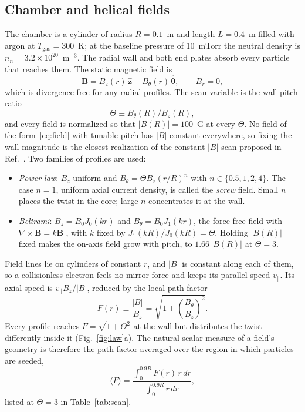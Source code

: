 \documentclass[11pt]{article}
\begin{document}
\subsection{Chamber and helical fields}
\label{sec:fields}

The chamber is a cylinder of radius $R = 0.1$~m and length $L = 0.4$~m filled with argon at $T_{\mathrm{gas}} = 300$~K; at the baseline pressure of 10~mTorr the neutral density is $n_n = 3.2\times10^{20}$~m$^{-3}$. The radial wall and both end plates absorb every particle that reaches them. The static magnetic field is
\begin{equation}
\mathbf{B} = B_z(r)\,\hat{\mathbf{z}} + B_\theta(r)\,\hat{\boldsymbol{\theta}}, \qquad B_r = 0,
\label{eq:field}
\end{equation}
which is divergence-free for any radial profiles. The scan variable is the wall pitch ratio
\begin{equation}
\Theta \equiv B_\theta(R)/B_z(R),
\end{equation}
and every field is normalized so that $|B(R)| = 100$~G at every $\Theta$. No field of the form~\eqref{eq:field} with tunable pitch has $|B|$ constant everywhere, so fixing the wall magnitude is the closest realization of the constant-$|B|$ scan proposed in Ref.~\cite{auerbach2026}. Two families of profiles are used:
\begin{itemize}
  \item \emph{Power law}: $B_z$ uniform and $B_\theta = \Theta B_z (r/R)^n$ with $n \in \{0.5, 1, 2, 4\}$. The case $n = 1$, uniform axial current density, is called the \emph{screw} field. Small $n$ places the twist in the core; large $n$ concentrates it at the wall.
  \item \emph{Beltrami}: $B_z = B_0 J_0(kr)$ and $B_\theta = B_0 J_1(kr)$, the force-free field with $\nabla\times\mathbf{B} = k\mathbf{B}$ \cite{taylor1974,freidberg}, with $k$ fixed by $J_1(kR)/J_0(kR) = \Theta$. Holding $|B(R)|$ fixed makes the on-axis field grow with pitch, to $1.66\,|B(R)|$ at $\Theta = 3$.
\end{itemize}

Field lines lie on cylinders of constant $r$, and $|B|$ is constant along each of them, so a collisionless electron feels no mirror force and keeps its parallel speed $v_\parallel$. Its axial speed is $v_\parallel B_z/|B|$, reduced by the local path factor
\begin{equation}
F(r) \equiv \frac{|B|}{B_z} = \sqrt{1 + \left(\frac{B_\theta}{B_z}\right)^2}.
\label{eq:pathfactor}
\end{equation}
Every profile reaches $F = \sqrt{1+\Theta^2}$ at the wall but distributes the twist differently inside it (Fig.~\ref{fig:law}a). The natural scalar measure of a field's geometry is therefore the path factor averaged over the region in which particles are seeded,
\begin{equation}
\langle F \rangle = \frac{\int_0^{0.9R} F(r)\, r\, dr}{\int_0^{0.9R} r\, dr},
\label{eq:meanF}
\end{equation}
listed at $\Theta = 3$ in Table~\ref{tab:scan}.
\end{document}
